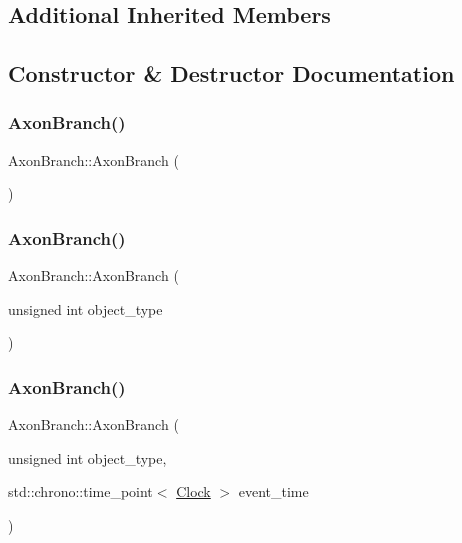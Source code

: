 \subsection*{Additional Inherited Members}


\subsection{Constructor \& Destructor Documentation}
\mbox{\label{classAxonBranch_a5bb6ccef8d94c937a85148af932221c0}} 
\subsubsection{\texorpdfstring{Axon\+Branch()}{AxonBranch()}\hspace{0.1cm}{\footnotesize\ttfamily [1/4]}}
{\footnotesize\ttfamily Axon\+Branch\+::\+Axon\+Branch (\begin{DoxyParamCaption}{ }\end{DoxyParamCaption})\hspace{0.3cm}{\ttfamily [inline]}}

\mbox{\label{classAxonBranch_a67618605ac3731556ab48a6583e21ba8}} 
\subsubsection{\texorpdfstring{Axon\+Branch()}{AxonBranch()}\hspace{0.1cm}{\footnotesize\ttfamily [2/4]}}
{\footnotesize\ttfamily Axon\+Branch\+::\+Axon\+Branch (\begin{DoxyParamCaption}\item[{unsigned int}]{object\+\_\+type }\end{DoxyParamCaption})\hspace{0.3cm}{\ttfamily [inline]}}

\mbox{\label{classAxonBranch_ad6191fcfd8bedc058a4f1cfb5056f5b2}} 
\subsubsection{\texorpdfstring{Axon\+Branch()}{AxonBranch()}\hspace{0.1cm}{\footnotesize\ttfamily [3/4]}}
{\footnotesize\ttfamily Axon\+Branch\+::\+Axon\+Branch (\begin{DoxyParamCaption}\item[{unsigned int}]{object\+\_\+type,  }\item[{std\+::chrono\+::time\+\_\+point$<$ \mbox{\hyperlink{universe_8h_a0ef8d951d1ca5ab3cfaf7ab4c7a6fd80}{Clock}} $>$}]{event\+\_\+time }\end{DoxyParamCaption})\hspace{0.3cm}{\ttfamily [inline]}}

